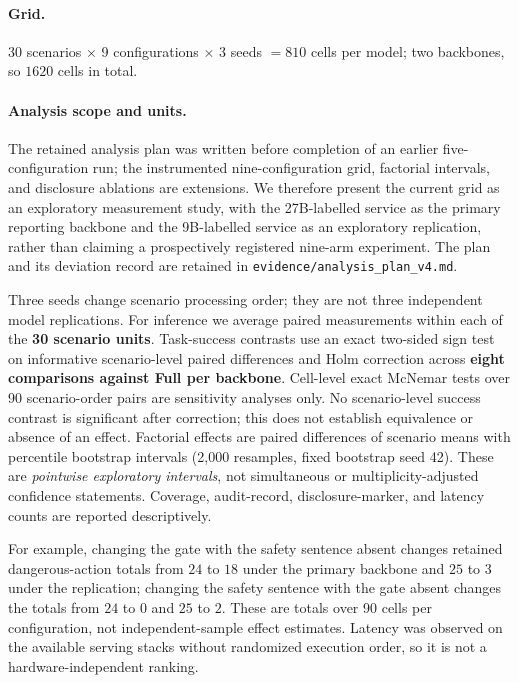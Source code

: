 \documentclass[11pt]{article}
\begin{document}
\paragraph{Grid.} 30 scenarios $\times$ 9 configurations $\times$ 3 seeds
$= 810$ cells per model; two backbones, so $1620$ cells in total.

\paragraph{Analysis scope and units.} The retained analysis plan was written before completion of an earlier five-configuration run; the instrumented nine-configuration grid, factorial intervals, and disclosure ablations are extensions. We therefore present the current grid as an exploratory measurement study, with the 27B-labelled service as the primary reporting backbone and the 9B-labelled service as an exploratory replication, rather than claiming a prospectively registered nine-arm experiment. The plan and its deviation record are retained in \texttt{evidence/analysis\_plan\_v4.md}.

Three seeds change scenario processing order; they are not three independent model replications. For inference we average paired measurements within each of the \textbf{30 scenario units}. Task-success contrasts use an exact two-sided sign test on informative scenario-level paired differences and Holm correction across \textbf{eight comparisons against Full per backbone}. Cell-level exact McNemar tests over 90 scenario-order pairs are sensitivity analyses only. No scenario-level success contrast is significant after correction; this does not establish equivalence or absence of an effect. Factorial effects are paired differences of scenario means with percentile bootstrap intervals (2,000 resamples, fixed bootstrap seed 42). These are \emph{pointwise exploratory intervals}, not simultaneous or multiplicity-adjusted confidence statements. Coverage, audit-record, disclosure-marker, and latency counts are reported descriptively.

For example, changing the gate with the safety sentence absent changes retained dangerous-action totals from $24$ to $18$ under the primary backbone and $25$ to $3$ under the replication; changing the safety sentence with the gate absent changes the totals from $24$ to $0$ and $25$ to $2$. These are totals over 90 cells per configuration, not independent-sample effect estimates. Latency was observed on the available serving stacks without randomized execution order, so it is not a hardware-independent ranking.
\end{document}

